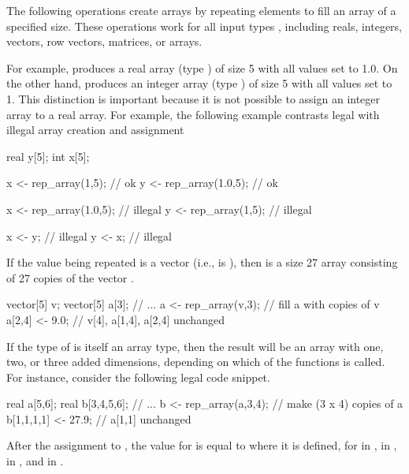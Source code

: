The following operations create arrays by repeating elements to fill
an array of a specified size.  These operations work for all input
types , including reals, integers, vectors, row vectors,
matrices, or arrays.
%
\begin{description}
%
%
\end{description}
%
For example,  produces a real array (type
) of size 5 with all values set to 1.0.  On the other
hand,  produces an integer array (type
) of size 5 with all values set to 1.  This distinction is
important because it is not possible to assign an integer array to a
real array.  For example, the following example contrasts legal with
illegal array creation and assignment
%
\begin{stancode}
real y[5];
int x[5];

x <- rep_array(1,5);     // ok
y <- rep_array(1.0,5);   // ok

x <- rep_array(1.0,5);   // illegal 
y <- rep_array(1,5);     // illegal

x <- y;                  // illegal
y <- x;                  // illegal
\end{stancode}

If the value being repeated  is a vector (i.e.,  is
), then  is a size 27 array
consisting of 27 copies of the vector .
%
\begin{stancode}
vector[5] v;
vector[5] a[3];
// ...
a <- rep_array(v,3);  // fill a with copies of v
a[2,4] <- 9.0;        // v[4], a[1,4], a[2,4] unchanged
\end{stancode}

If the type  of  is itself an array type, then the
result will be an array with one, two, or three added dimensions,
depending on which of the  functions is called.  For
instance, consider the following legal code snippet.
%
\begin{stancode}
real a[5,6];
real b[3,4,5,6];
// ...
b <- rep_array(a,3,4); //  make (3 x 4) copies of a
b[1,1,1,1] <- 27.9;    //  a[1,1] unchanged
\end{stancode}
%
After the assignment to , the value for  is
equal to  where it is defined, for  in ,
 in ,  in , and  in
.

